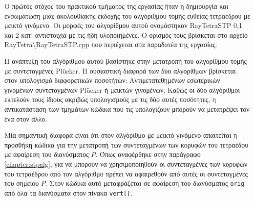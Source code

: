 \noindent Ο πρώτος στόχος του πρακτικού τμήματος της εργασίας ήταν η δημιουργία και ενσωμάτωση μιας ακολουθιακής εκδοχής του αλγόριθμου τομής ευθείας-τετραέδρου με μεικτό γινόμενο. Οι μορφές του αλγορίθμου αυτού ονομάστηκαν RayTetraSTP 0,1 και 2 κατ' αντιστοιχία με τις ήδη υλοποιημένες. Ο ορισμός τους βρίσκεται στο αρχείο RayTetra\textbackslash RayTetraSTP.cpp που περιέχεται στα παραδοτέα της εργασίας.

Η ανάπτυξη του αλγόριθμου αυτού βασίστηκε στην μετατροπή του αλγορίθμου τομής με συντεταγμένες Plücker. Η ουσιαστική διαφορά των δύο αλγορίθμων βρίσκεται στον υπολογισμό διαφορετικών ποσοτήτων: Αντιμετατεθημένων εσωτερικών γινομένων συντεταγμένων Plücker ή μεικτών γινομένων. Καθώς οι δύο αλγόριθμοι εκτελούν τους ίδιους ακριβώς υπολογισμούς με τις δύο αυτές ποσότητες, η αντικατάσταση των τμημάτων κώδικα που τις υπολογίζουν μπορούν να μετατρέψει τον ένα στον άλλο. 

Μία σημαντική διαφορά είναι ότι στον αλγόριθμο με μεικτό γινόμενο απαιτείται η προσθήκη κώδικα για την μετατροπή των συντεταγμένων των κορυφών του τετραέδου με αφαίρεση του διανύσματος $P$. Όπως αναφέρθηκε στην παράγραφο \ref{chapter:stpalg}, για να μπορούν να χρησιμοποιηθούν οι συντεταγμένες των κορυφών του τετραέδρου από τον αλγόριθμο πρέπει να αφαιρεθούν από αυτές οι συντεταγμένες του σημείου $P$. Στον κώδικα αυτό μεταφράζεται σε αφαίρεση του διανύσματος \verb!orig! από όλα τα διανύσματα στον πίνακα \verb!vert[]!. 

